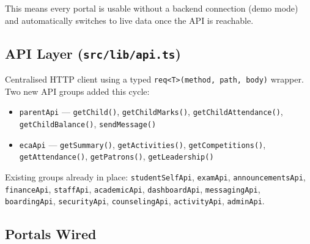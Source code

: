 \documentclass[11pt, a4paper]{article}
\newcommand{\code}[1]{\texttt{\small #1}}
\begin{document}
This means every portal is usable without a backend connection (demo mode)
and automatically switches to live data once the API is reachable.

\subsection{API Layer (\code{src/lib/api.ts})}

Centralised HTTP client using a typed \code{req<T>(method, path, body)} wrapper.
Two new API groups added this cycle:

\begin{itemize}[leftmargin=1.5em, itemsep=2pt]
  \item \code{parentApi} --- \code{getChild()}, \code{getChildMarks()},
    \code{getChildAttendance()}, \code{getChildBalance()}, \code{sendMessage()}

  \item \code{ecaApi} --- \code{getSummary()}, \code{getActivities()},
    \code{getCompetitions()}, \code{getAttendance()}, \code{getPatrons()},
    \code{getLeadership()}
\end{itemize}

Existing groups already in place: \code{studentSelfApi}, \code{examApi},
\code{announcementsApi}, \code{financeApi}, \code{staffApi}, \code{academicApi},
\code{dashboardApi}, \code{messagingApi}, \code{boardingApi}, \code{securityApi},
\code{counselingApi}, \code{activityApi}, \code{adminApi}.

\subsection{Portals Wired}
\end{document}
